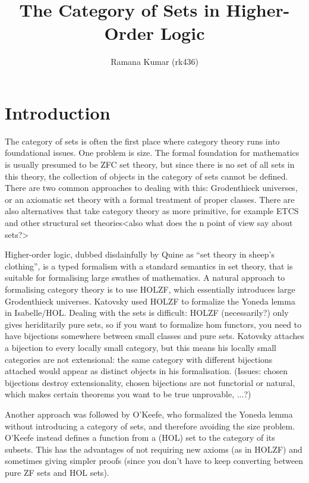 \documentclass{article}
\title{The Category of Sets in Higher-Order Logic}
\author{Ramana Kumar (rk436)}
\begin{document}
\maketitle

\section{Introduction}
The category of sets is often the first place where category theory runs into foundational issues.
One problem is size.
The formal foundation for mathematics is usually presumed to be ZFC set theory, but since there is no set of all sets in this theory, the collection of objects in the category of sets cannot be defined.
There are two common approaches to dealing with this: Grodenthieck universes, or an axiomatic set theory with a formal treatment of proper classes.
There are also alternatives that take category theory as more primitive, for example ETCS and other structural set theories<also what does the n point of view say about sets?>

Higher-order logic, dubbed disdainfully by Quine as ``set theory in sheep's clothing'', is a typed formalism with a standard semantics in set theory, that is suitable for formalising large swathes of mathematics.
A natural approach to formalising category theory is to use HOLZF, which essentially introduces large Grodenthieck universes.
Katovsky used HOLZF to formalize the Yoneda lemma in Isabelle/HOL.
Dealing with the sets is difficult: HOLZF (necessarily?) only gives heriditarily pure sets, so if you want to formalize hom functors, you need to have bijections somewhere between small classes and pure sets.
Katovsky attaches a bijection to every locally small category, but this means his locally small categories are not extensional: the same category with different bijections attached would appear as distinct objects in his formalisation.
(Issues: chosen bijections destroy extensionality, chosen bijections are not functorial or natural, which makes certain theorems you want to be true unprovable, ...?)

Another approach was followed by O'Keefe, who formalized the Yoneda lemma without introducing a category of sets, and therefore avoiding the size problem.
O'Keefe instead defines a function from a (HOL) set to the category of its subsets.
This has the advantages of not requiring new axioms (as in HOLZF) and sometimes giving simpler proofs (since you don't have to keep converting between pure ZF sets and HOL sets).
\end{document}
